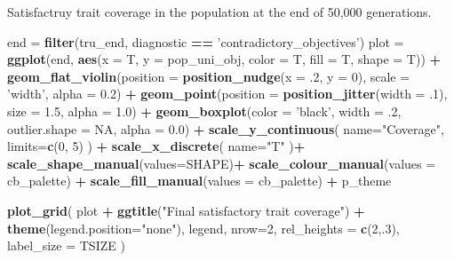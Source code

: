 \documentclass[]{book}
\newenvironment{Shaded}{\begin{snugshade}}{\end{snugshade}}
\newcommand{\DataTypeTok}[1]{\textcolor[rgb]{0.13,0.29,0.53}{#1}}
\newcommand{\DecValTok}[1]{\textcolor[rgb]{0.00,0.00,0.81}{#1}}
\newcommand{\FloatTok}[1]{\textcolor[rgb]{0.00,0.00,0.81}{#1}}
\newcommand{\KeywordTok}[1]{\textcolor[rgb]{0.13,0.29,0.53}{\textbf{#1}}}
\newcommand{\NormalTok}[1]{#1}
\newcommand{\OperatorTok}[1]{\textcolor[rgb]{0.81,0.36,0.00}{\textbf{#1}}}
\newcommand{\OtherTok}[1]{\textcolor[rgb]{0.56,0.35,0.01}{#1}}
\newcommand{\StringTok}[1]{\textcolor[rgb]{0.31,0.60,0.02}{#1}}
\begin{document}
Satisfactruy trait coverage in the population at the end of 50,000 generations.

\begin{Shaded}
\begin{Highlighting}[]
\NormalTok{end =}\StringTok{ }\KeywordTok{filter}\NormalTok{(tru_end, diagnostic }\OperatorTok{==}\StringTok{ 'contradictory_objectives'}\NormalTok{)}
\NormalTok{plot =}\StringTok{ }\KeywordTok{ggplot}\NormalTok{(end, }\KeywordTok{aes}\NormalTok{(}\DataTypeTok{x =}\NormalTok{ T, }\DataTypeTok{y =}\NormalTok{ pop_uni_obj, }\DataTypeTok{color =}\NormalTok{ T, }\DataTypeTok{fill =}\NormalTok{ T, }\DataTypeTok{shape =}\NormalTok{ T)) }\OperatorTok{+}
\StringTok{  }\KeywordTok{geom_flat_violin}\NormalTok{(}\DataTypeTok{position =} \KeywordTok{position_nudge}\NormalTok{(}\DataTypeTok{x =} \FloatTok{.2}\NormalTok{, }\DataTypeTok{y =} \DecValTok{0}\NormalTok{), }\DataTypeTok{scale =} \StringTok{'width'}\NormalTok{, }\DataTypeTok{alpha =} \FloatTok{0.2}\NormalTok{) }\OperatorTok{+}
\StringTok{  }\KeywordTok{geom_point}\NormalTok{(}\DataTypeTok{position =} \KeywordTok{position_jitter}\NormalTok{(}\DataTypeTok{width =} \FloatTok{.1}\NormalTok{), }\DataTypeTok{size =} \FloatTok{1.5}\NormalTok{, }\DataTypeTok{alpha =} \FloatTok{1.0}\NormalTok{) }\OperatorTok{+}
\StringTok{  }\KeywordTok{geom_boxplot}\NormalTok{(}\DataTypeTok{color =} \StringTok{'black'}\NormalTok{, }\DataTypeTok{width =} \FloatTok{.2}\NormalTok{, }\DataTypeTok{outlier.shape =} \OtherTok{NA}\NormalTok{, }\DataTypeTok{alpha =} \FloatTok{0.0}\NormalTok{) }\OperatorTok{+}
\StringTok{  }\KeywordTok{scale_y_continuous}\NormalTok{(}
    \DataTypeTok{name=}\StringTok{"Coverage"}\NormalTok{,}
    \DataTypeTok{limits=}\KeywordTok{c}\NormalTok{(}\DecValTok{0}\NormalTok{, }\DecValTok{5}\NormalTok{)}
\NormalTok{  ) }\OperatorTok{+}
\StringTok{  }\KeywordTok{scale_x_discrete}\NormalTok{(}
    \DataTypeTok{name=}\StringTok{"T"}
\NormalTok{  )}\OperatorTok{+}
\StringTok{  }\KeywordTok{scale_shape_manual}\NormalTok{(}\DataTypeTok{values=}\NormalTok{SHAPE)}\OperatorTok{+}
\StringTok{  }\KeywordTok{scale_colour_manual}\NormalTok{(}\DataTypeTok{values =}\NormalTok{ cb_palette) }\OperatorTok{+}
\StringTok{  }\KeywordTok{scale_fill_manual}\NormalTok{(}\DataTypeTok{values =}\NormalTok{ cb_palette) }\OperatorTok{+}
\StringTok{  }\NormalTok{p_theme}

\KeywordTok{plot_grid}\NormalTok{(}
\NormalTok{  plot }\OperatorTok{+}
\StringTok{    }\KeywordTok{ggtitle}\NormalTok{(}\StringTok{"Final satisfactory trait coverage"}\NormalTok{) }\OperatorTok{+}
\StringTok{    }\KeywordTok{theme}\NormalTok{(}\DataTypeTok{legend.position=}\StringTok{"none"}\NormalTok{),}
\NormalTok{  legend,}
  \DataTypeTok{nrow=}\DecValTok{2}\NormalTok{,}
  \DataTypeTok{rel_heights =} \KeywordTok{c}\NormalTok{(}\DecValTok{2}\NormalTok{,.}\DecValTok{3}\NormalTok{),}
  \DataTypeTok{label_size =}\NormalTok{ TSIZE}
\NormalTok{)}
\end{Highlighting}
\end{Shaded}
\end{document}
